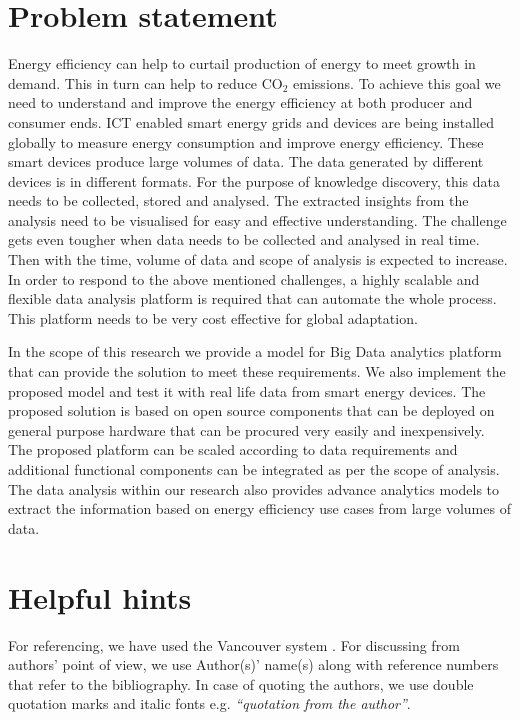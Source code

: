 \section{Problem statement}

Energy efficiency can help to curtail production of energy to meet growth in demand. This in turn can help to reduce CO\(_{2}\) emissions. To achieve this goal we need to understand and improve the energy efficiency at both producer and consumer ends. ICT enabled smart energy grids and devices are being installed globally to measure energy consumption and improve energy efficiency. These smart devices produce large volumes of data. The data generated by different devices is in different formats. For the purpose of knowledge discovery, this data needs to be collected, stored and analysed. The extracted insights from the analysis need to be visualised for easy and effective understanding. The challenge gets even tougher when data needs to be collected and analysed in real time. Then with the time, volume of data and scope of analysis is expected to increase. In order to respond to the above mentioned challenges, a highly scalable and flexible data analysis platform is required that can automate the whole process. This platform needs to be very cost effective for global adaptation.
 
In the scope of this research we provide a model for Big Data analytics platform that can provide the solution to meet these requirements. We also implement the proposed model and test it with real life data from smart energy devices. The proposed solution is based on open source components that can be deployed on general purpose hardware that can be procured very easily and inexpensively. The proposed platform can be scaled according to data requirements and additional functional components can be integrated as per the scope of analysis. The data analysis within our research also provides advance analytics models to extract the information based on energy efficiency use cases from large volumes of data.


\section{Helpful hints}

For referencing, we have used  the Vancouver system \cite{neville2012referencing}. For discussing from authors' point of view, we use Author(s)' name(s) along with reference numbers that refer to the bibliography. In case of quoting the authors, we use double quotation marks and italic fonts e.g. \emph{``quotation from the author''}.

